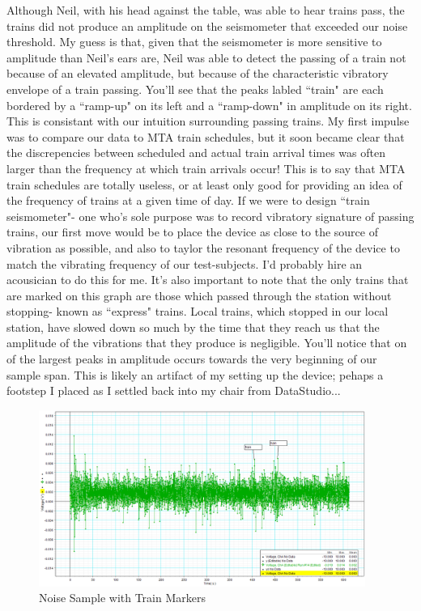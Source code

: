 \documentclass{amsart}
\begin{document}
Although Neil, with his head against the table, was able to hear trains pass, the trains did not produce an amplitude on the seismometer that exceeded our noise threshold. My guess is that, given that the seismometer is more sensitive to amplitude than Neil's ears are, Neil was able to detect the passing of a train not because of an elevated amplitude, but because of the characteristic vibratory envelope of a train passing. You'll see that the peaks labled ``train" are each bordered by a ``ramp-up" on its left and a ``ramp-down" in amplitude on its right. This is consistant with our intuition surrounding passing trains. My first impulse was to compare our data to MTA train schedules, but it soon became clear that the discrepencies between scheduled and actual train arrival times was often larger than the frequency at which train arrivals occur! This is to say that MTA train schedules are totally useless, or at least only good for providing an idea of the frequency of trains at a given time of day. If we were to design ``train seismometer"\-- one who's sole purpose was to record vibratory signature of passing trains, our first move would be to place the device as close to the source of vibration as possible, and also to taylor the resonant frequency of the device to match the vibrating frequency of our test-subjects. I'd probably hire an acousician to do this for me. It's also important to note that the only trains that are marked on this graph are those which passed through the station without stopping\-- known as ``express" trains. Local trains, which stopped in our local station, have slowed down so much by the time that they reach us that the amplitude of the vibrations that they produce is negligible. You'll notice that on of the largest peaks in amplitude occurs towards the very beginning of our sample span. This is likely an artifact of my setting up the device; pehaps a footstep I placed as I settled back into my chair from DataStudio...
\begin{figure}[H]
    \includegraphics[width=0.95\textwidth]{train2.png}
    \caption{Noise Sample with Train Markers}
\end{figure}
\end{document}
